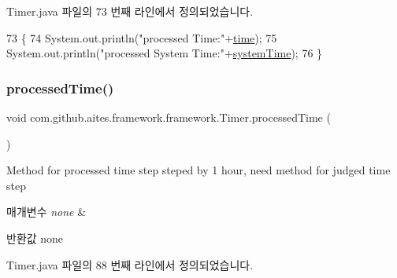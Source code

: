 Timer.\+java 파일의 73 번째 라인에서 정의되었습니다.


\begin{DoxyCode}
73                             \{
74         System.out.println(\textcolor{stringliteral}{"processed Time:"}+\mbox{\hyperlink{classcom_1_1github_1_1aites_1_1framework_1_1framework_1_1_timer_a04901e0f7fd1f7024218cba52d7a8b26}{time}});
75         System.out.println(\textcolor{stringliteral}{"processed System Time:"}+\mbox{\hyperlink{classcom_1_1github_1_1aites_1_1framework_1_1framework_1_1_timer_a22ebaa7134740910d846b3bdbd416aef}{systemTime}});
76     \}
\end{DoxyCode}
\mbox{\label{classcom_1_1github_1_1aites_1_1framework_1_1framework_1_1_timer_a6f56ca908a3de33e23e16339573ae02f}} 
\subsubsection{\texorpdfstring{processed\+Time()}{processedTime()}}
{\footnotesize\ttfamily void com.\+github.\+aites.\+framework.\+framework.\+Timer.\+processed\+Time (\begin{DoxyParamCaption}{ }\end{DoxyParamCaption})}



Method for processed time step steped by 1 hour, need method for judged time step 


\begin{DoxyParams}{매개변수}
{\em none} & \\
\hline
\end{DoxyParams}
\begin{DoxyReturn}{반환값}
none 
\end{DoxyReturn}


Timer.\+java 파일의 88 번째 라인에서 정의되었습니다.


